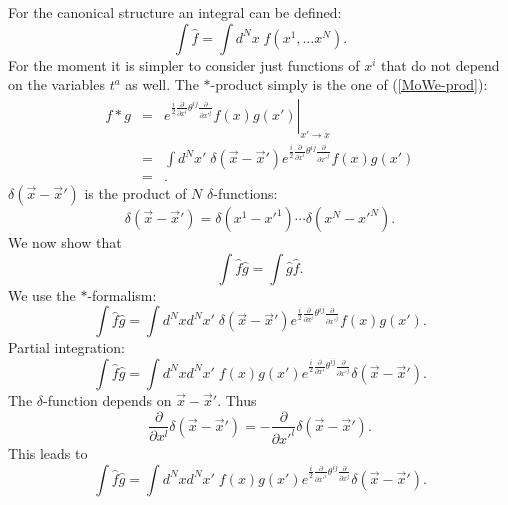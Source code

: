 \documentclass[a4paper,11pt]{article}
\def\nn{\nonumber }
\def\x{\hat x}
\def\pat{\partial}
\begin{document}

For the canonical structure an integral can be defined:
\begin{equation}
  \int \hat{f}=\int d^Nx\;f(x^1,\ldots x^N).
\end{equation}
For the moment it is simpler to consider just functions of $x^i$ that do not 
depend on the variables $t^a$ as well. The $*$-product simply is the one of (\ref{MoWe-prod}): 
\begin{eqnarray}
  f*g&=&\left.e^{\frac{i}{2}\frac{\pat}{\pat x^i}\theta^{ij}\frac{\pat}{\pat x'^j}}f(x)g(x')\right|_{x'\to x}\nn\\
  &=&\int d^Nx'\;\delta(\vec{x}-\vec{x}')e^{\frac{i}{2}\frac{\pat}{\pat
x^i}\theta^{ij}\frac{\pat}{\pat x'^j}}f(x)g(x') \nn\\
  &=&.   \end{eqnarray}
$\delta(\vec{x}-\vec{x}')$ is the product of $N$ $\delta$-functions:
\begin{equation}
  \delta(\vec{x}-\vec{x}')=\delta(x^1-x'^1)\cdots\delta(x^N-x'^N).
\end{equation}
We now show that
\begin{equation}
  \int \hat{f}\hat{g}=\int\hat{g}\hat{f}.
\end{equation}
We use the $*$-formalism:
\begin{equation}
  \int \hat{f}\hat{g}=\int d^Nxd^Nx'\;\delta(\vec{x}-\vec{x}')e^{\frac{i}{2}\frac{\pat}{\pat x^i}\theta^{ij}\frac{\pat}{\pat x'^j}}f(x)g(x').
\end{equation}
Partial integration:
\begin{equation}
  \int \hat{f}\hat{g}=\int d^Nxd^Nx'\;f(x)g(x')e^{\frac{i}{2}\frac{\pat}{\pat x^i}\theta^{ij}\frac{\pat}{\pat x'^j}}\delta(\vec{x}-\vec{x}').  
\end{equation}
The $\delta$-function depends on $\vec{x}-\vec{x}'$. Thus
\begin{equation}
  \frac{\pat}{\pat x^l}\delta(\vec{x}-\vec{x}')=-\frac{\pat}{\pat x'^l}\delta(\vec{x}-\vec{x}').
\end{equation}
This leads to
\begin{equation}
  \int \hat{f}\hat{g}=\int d^Nxd^Nx'\;f(x)g(x')e^{\frac{i}{2}\frac{\pat}{\pat x'^i}\theta^{ij}\frac{\pat}{\pat x^j}}\delta(\vec{x}-\vec{x}').  
\end{equation}
\end{document}
